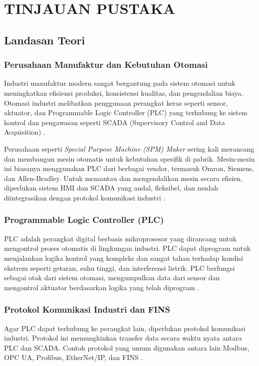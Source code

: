 \chapter{TINJAUAN PUSTAKA}

\section{Landasan Teori}

\subsection{Perusahaan Manufaktur dan Kebutuhan Otomasi}
Industri manufaktur modern sangat bergantung pada sistem otomasi untuk meningkatkan efisiensi produksi, konsistensi kualitas, dan pengendalian biaya. Otomasi industri melibatkan penggunaan perangkat keras seperti sensor, aktuator, dan Programmable Logic Controller (PLC) yang terhubung ke sistem kontrol dan pengawasan seperti SCADA (Supervisory Control and Data Acquisition) \parencite{sastoque2023assessing}.

Perusahaan seperti \textit{Special Purpose Machine (SPM) Maker} sering kali merancang dan membangun mesin otomatis untuk kebutuhan spesifik di pabrik. Mesin-mesin ini biasanya menggunakan PLC dari berbagai vendor, termasuk Omron, Siemens, dan Allen-Bradley. Untuk memantau dan mengendalikan mesin secara efisien, diperlukan sistem HMI dan SCADA yang andal, fleksibel, dan mudah diintegrasikan dengan protokol komunikasi industri \parencite{humaj2021fins}.

\subsection{Programmable Logic Controller (PLC)}
PLC adalah perangkat digital berbasis mikroprosesor yang dirancang untuk mengontrol proses otomatis di lingkungan industri. PLC dapat diprogram untuk menjalankan logika kontrol yang kompleks dan sangat tahan terhadap kondisi ekstrem seperti getaran, suhu tinggi, dan interferensi listrik. PLC berfungsi sebagai otak dari sistem otomasi, mengumpulkan data dari sensor dan mengontrol aktuator berdasarkan logika yang telah diprogram \parencite{emqx2023fins}.

\subsection{Protokol Komunikasi Industri dan FINS}
Agar PLC dapat terhubung ke perangkat lain, diperlukan protokol komunikasi industri. Protokol ini memungkinkan transfer data secara waktu nyata antara PLC dan SCADA. Contoh protokol yang umum digunakan antara lain Modbus, OPC UA, Profibus, EtherNet/IP, dan FINS \parencite{sastoque2023assessing}.

